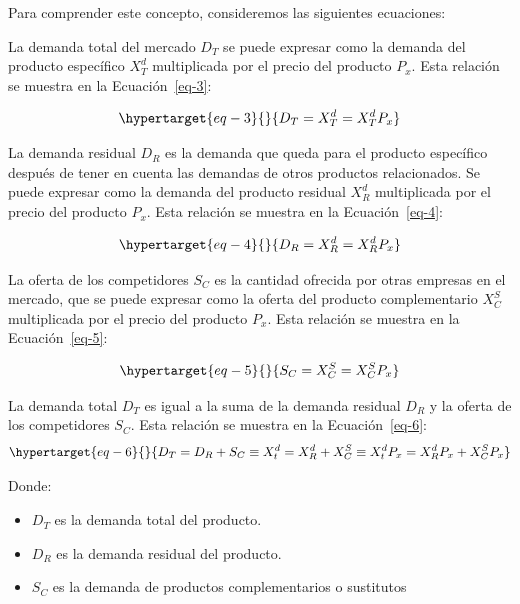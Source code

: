 \documentclass[
  a4paper,
]{article}
\providecommand{\tightlist}{%
  \setlength{\itemsep}{0pt}\setlength{\parskip}{0pt}}\usepackage{longtable,booktabs,array}
\begin{document}
Para comprender este concepto, consideremos las siguientes ecuaciones:

La demanda total del mercado \(D_T\) se puede expresar como la demanda
del producto específico \(X_T^d\) multiplicada por el precio del
producto \(P_x\). Esta relación se muestra en la Ecuación~\ref{eq-3}:

\begin{equation}\protect\hypertarget{eq-3}{}{
D_T = X_{T}^{d} = X_{T}^{d} P_{x}
}\label{eq-3}\end{equation}

La demanda residual \(D_R\) es la demanda que queda para el producto
específico después de tener en cuenta las demandas de otros productos
relacionados. Se puede expresar como la demanda del producto residual
\(X_R^d\) multiplicada por el precio del producto \(P_x\). Esta relación
se muestra en la Ecuación~\ref{eq-4}:

\begin{equation}\protect\hypertarget{eq-4}{}{
D_R = X_R^d = X_R^d P_x
}\label{eq-4}\end{equation}

La oferta de los competidores \(S_C\) es la cantidad ofrecida por otras
empresas en el mercado, que se puede expresar como la oferta del
producto complementario \(X_C^S\) multiplicada por el precio del
producto \(P_x\). Esta relación se muestra en la Ecuación~\ref{eq-5}:

\begin{equation}\protect\hypertarget{eq-5}{}{
S_C = X_C^S = X_C^S P_x
}\label{eq-5}\end{equation}

La demanda total \(D_T\) es igual a la suma de la demanda residual
\(D_R\) y la oferta de los competidores \(S_C\). Esta relación se
muestra en la Ecuación~\ref{eq-6}:
\begin{equation}\protect\hypertarget{eq-6}{}{
D_T = D_R + S_C \equiv X_t^d = X_R^d + X_C^S \equiv X_t^d P_x = X_R^d P_x + X_C^S P_x
}\label{eq-6}\end{equation}

Donde:

\begin{itemize}
\tightlist
\item
  \(D_T\) es la demanda total del producto.
\item
  \(D_R\) es la demanda residual del producto.
\item
  \(S_C\) es la demanda de productos complementarios o sustitutos
\end{itemize}
\end{document}
